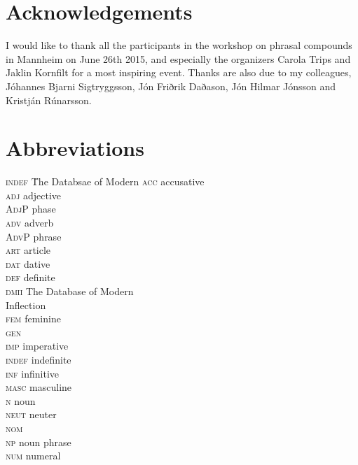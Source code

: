 \documentclass[output=paper]{LSP/langsci}
\begin{document}
\begin{xlist}
 
\section*{Acknowledgements}
I would like to thank all the participants in the workshop on phrasal compounds in Mannheim on June 26th 2015, and especially the organizers Carola Trips and Jaklin Kornfilt for a most inspiring event. Thanks are also due to my colleagues, Jóhannes Bjarni Sigtryggsson, Jón Friðrik Daðason, Jón Hilmar Jónsson and Krist\-ján Rúnarsson.


\section*{Abbreviations}
\begin{multicols}{2}
\begin{tabbing}
 \textsc{indef} \hspace{1em} \= The Databsae of Modern\kill
\textsc{acc} \> accusative             \\
\textsc{adj} \> adjective              \\
\textsc{AdjP} \>  phase      \\
\textsc{adv} \> adverb                 \\
\textsc{AdvP} \>  phrase      \\
\textsc{art} \> article                \\
\textsc{dat} \> dative                 \\
\textsc{def} \> definite               \\
\textsc{dmii} \> The Database of Modern\\
\textsc{}      \>  Inflection\\
\textsc{fem} \> feminine               \\
\textsc{gen} \>                \\
\textsc{imp} \> imperative             \\
\textsc{indef} \> indefinite           \\
\textsc{inf} \> infinitive             \\
\textsc{masc} \> masculine     \\ 
\textsc{n} \> noun\\
\textsc{neut} \> neuter\\
\textsc{nom} \> \\
\textsc{np} \> noun phrase\\
\textsc{num} \>numeral\\

\end{tabbing}
\end{multicols}
\end{xlist}
\end{document}
